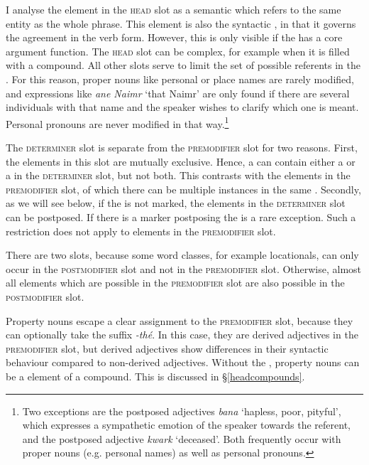 I analyse the element in the \textsc{head} slot as a semantic  which refers to the same entity as the whole phrase. This element is also the syntactic , in that it governs the agreement in the verb form. However, this is only visible if the  has a core argument function. The \textsc{head} slot can be complex, for example when it is filled with a compound. All other slots serve to limit the set of possible referents in the . For this reason, proper nouns like personal or place names are rarely modified, and expressions like \emph{ane Naimr} `that Naimr' are only found if there are several individuals with that name and the speaker wishes to clarify which one is meant. Personal pronouns are never modified in that way.\footnote{Two exceptions are the postposed adjectives \emph{bana} `hapless, poor, pityful', which expresses a sympathetic emotion of the speaker towards the referent, and the postposed adjective \emph{kwark} `deceased'. Both frequently occur with proper nouns (e.g. personal names) as well as personal pronouns.}%

The \textsc{determiner} slot is separate from the \textsc{premodifier} slot for two reasons. First, the elements in this slot are mutually exclusive. Hence, a  can contain either a  or a  in the \textsc{determiner} slot, but not both. This contrasts with the elements in the \textsc{premodifier} slot, of which there can be multiple instances in the same . Secondly, as we will see below, if the  is not  marked, the elements in the \textsc{determiner} slot can be postposed. If there is a  marker postposing the  is a rare exception. Such a restriction does not apply to elements in the \textsc{premodifier} slot.%

There are two  slots, because some word classes, for example locationals, can only occur in the \textsc{postmodifier} slot and not in the \textsc{premodifier} slot. Otherwise, almost all elements which are possible in the \textsc{premodifier} slot are also possible in the \textsc{postmodifier} slot.%

Property nouns escape a clear assignment to the \textsc{premodifier} slot, because they can optionally take the  suffix \emph{-thé}. In this case, they are derived adjectives in the \textsc{premodifier} slot, but derived adjectives show differences in their syntactic behaviour compared to non-derived adjectives. Without the , property nouns can be a  element of a  compound. This is discussed in \S{}\ref{headcompounds}.

